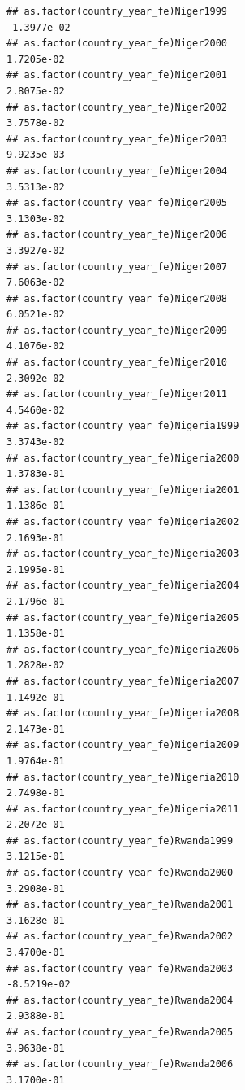 \documentclass[
  a4paper,
]{article}
\begin{document}
\begin{verbatim}
## as.factor(country_year_fe)Niger1999                            -1.3977e-02
## as.factor(country_year_fe)Niger2000                             1.7205e-02
## as.factor(country_year_fe)Niger2001                             2.8075e-02
## as.factor(country_year_fe)Niger2002                             3.7578e-02
## as.factor(country_year_fe)Niger2003                             9.9235e-03
## as.factor(country_year_fe)Niger2004                             3.5313e-02
## as.factor(country_year_fe)Niger2005                             3.1303e-02
## as.factor(country_year_fe)Niger2006                             3.3927e-02
## as.factor(country_year_fe)Niger2007                             7.6063e-02
## as.factor(country_year_fe)Niger2008                             6.0521e-02
## as.factor(country_year_fe)Niger2009                             4.1076e-02
## as.factor(country_year_fe)Niger2010                             2.3092e-02
## as.factor(country_year_fe)Niger2011                             4.5460e-02
## as.factor(country_year_fe)Nigeria1999                           3.3743e-02
## as.factor(country_year_fe)Nigeria2000                           1.3783e-01
## as.factor(country_year_fe)Nigeria2001                           1.1386e-01
## as.factor(country_year_fe)Nigeria2002                           2.1693e-01
## as.factor(country_year_fe)Nigeria2003                           2.1995e-01
## as.factor(country_year_fe)Nigeria2004                           2.1796e-01
## as.factor(country_year_fe)Nigeria2005                           1.1358e-01
## as.factor(country_year_fe)Nigeria2006                           1.2828e-02
## as.factor(country_year_fe)Nigeria2007                           1.1492e-01
## as.factor(country_year_fe)Nigeria2008                           2.1473e-01
## as.factor(country_year_fe)Nigeria2009                           1.9764e-01
## as.factor(country_year_fe)Nigeria2010                           2.7498e-01
## as.factor(country_year_fe)Nigeria2011                           2.2072e-01
## as.factor(country_year_fe)Rwanda1999                            3.1215e-01
## as.factor(country_year_fe)Rwanda2000                            3.2908e-01
## as.factor(country_year_fe)Rwanda2001                            3.1628e-01
## as.factor(country_year_fe)Rwanda2002                            3.4700e-01
## as.factor(country_year_fe)Rwanda2003                           -8.5219e-02
## as.factor(country_year_fe)Rwanda2004                            2.9388e-01
## as.factor(country_year_fe)Rwanda2005                            3.9638e-01
## as.factor(country_year_fe)Rwanda2006                            3.1700e-01

\end{verbatim}
\end{document}
